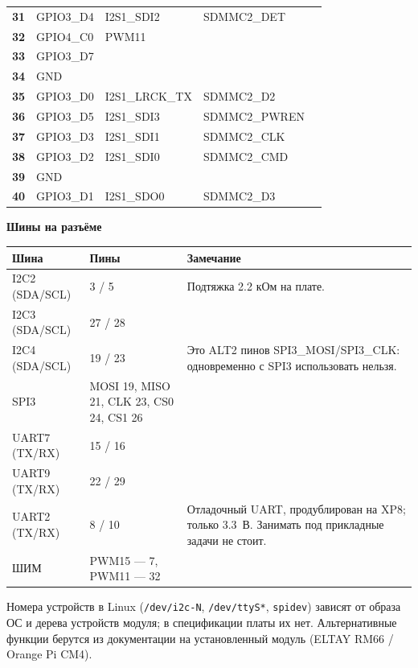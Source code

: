 \documentclass[10pt,a4paper]{article}
\begin{document}
\begin{longtable}{@{}>{\bfseries}r l l l p{5.2cm}@{}}
31 & GPIO3\_D4 & I2S1\_SDI2 & SDMMC2\_DET &  \\
32 & GPIO4\_C0 & PWM11 &  &  \\
33 & GPIO3\_D7 &  &  &  \\
34 & GND &  &  &  \\
35 & GPIO3\_D0 & I2S1\_LRCK\_TX & SDMMC2\_D2 &  \\
36 & GPIO3\_D5 & I2S1\_SDI3 & SDMMC2\_PWREN &  \\
37 & GPIO3\_D3 & I2S1\_SDI1 & SDMMC2\_CLK &  \\
38 & GPIO3\_D2 & I2S1\_SDI0 & SDMMC2\_CMD &  \\
39 & GND &  &  &  \\
40 & GPIO3\_D1 & I2S1\_SDO0 & SDMMC2\_D3 &  \\
\bottomrule
\end{longtable}

\vspace{2pt}
{\large\bfseries Шины на разъёме}\\[3pt]
\footnotesize
\begin{tabular}{@{}l l p{9cm}@{}}
\toprule
Шина & Пины & Замечание \\
\midrule
I2C2 (SDA/SCL) & 3 / 5 & Подтяжка 2.2 кОм на плате. \\
I2C3 (SDA/SCL) & 27 / 28 & \\
I2C4 (SDA/SCL) & 19 / 23 & Это ALT2 пинов SPI3\_MOSI/SPI3\_CLK: одновременно с SPI3 использовать нельзя. \\
SPI3 & MOSI 19, MISO 21, CLK 23, CS0 24, CS1 26 & \\
UART7 (TX/RX) & 15 / 16 & \\
UART9 (TX/RX) & 22 / 29 & \\
UART2 (TX/RX) & 8 / 10 & Отладочный UART, продублирован на XP8; только 3.3~В. Занимать под прикладные задачи не стоит. \\
ШИМ & PWM15 --- 7, PWM11 --- 32 & \\
\bottomrule
\end{tabular}

\vspace{4pt}
{\footnotesize Номера устройств в Linux (\texttt{/dev/i2c-N}, \texttt{/dev/ttyS*}, \texttt{spidev}) зависят от образа ОС и дерева устройств модуля; в спецификации платы их нет. Альтернативные функции берутся из документации на установленный модуль (ELTAY RM66 / Orange Pi CM4).}
\end{document}
